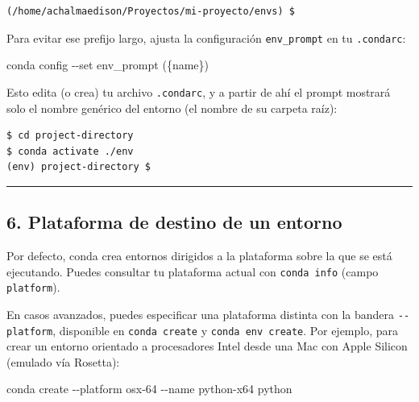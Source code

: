 \documentclass[
  doc,
  floatsintext,
  longtable,
  a4paper,
  nolmodern,
  notxfonts,
  notimes,
  12pt,
  colorlinks=true,linkcolor=blue,citecolor=blue,urlcolor=blue]{apa7}
\newenvironment{Shaded}{\begin{snugshade}}{\end{snugshade}}
\newcommand{\AttributeTok}[1]{\textcolor[rgb]{0.40,0.45,0.13}{#1}}
\newcommand{\ExtensionTok}[1]{\textcolor[rgb]{0.00,0.23,0.31}{#1}}
\newcommand{\NormalTok}[1]{\textcolor[rgb]{0.00,0.23,0.31}{#1}}
\newcommand{\StringTok}[1]{\textcolor[rgb]{0.13,0.47,0.30}{#1}}
\begin{document}
\begin{verbatim}
(/home/achalmaedison/Proyectos/mi-proyecto/envs) $
\end{verbatim}

Para evitar ese prefijo largo, ajusta la configuración
\texttt{env\_prompt} en tu \texttt{.condarc}:

\begin{Shaded}
\begin{Highlighting}[]
\ExtensionTok{conda}\NormalTok{ config }\AttributeTok{{-}{-}set}\NormalTok{ env\_prompt }\StringTok{\textquotesingle{}(\{name\})\textquotesingle{}}
\end{Highlighting}
\end{Shaded}

Esto edita (o crea) tu archivo \texttt{.condarc}, y a partir de ahí el
prompt mostrará solo el nombre genérico del entorno (el nombre de su
carpeta raíz):

\begin{verbatim}
$ cd project-directory
$ conda activate ./env
(env) project-directory $
\end{verbatim}

\begin{center}\rule{0.5\linewidth}{0.5pt}\end{center}

\subsection{6. Plataforma de destino de un
entorno}\label{plataforma-de-destino-de-un-entorno}

Por defecto, conda crea entornos dirigidos a la plataforma sobre la que
se está ejecutando. Puedes consultar tu plataforma actual con
\texttt{conda\ info} (campo \texttt{platform}).

En casos avanzados, puedes especificar una plataforma distinta con la
bandera \texttt{-\/-platform}, disponible en \texttt{conda\ create} y
\texttt{conda\ env\ create}. Por ejemplo, para crear un entorno
orientado a procesadores Intel desde una Mac con Apple Silicon (emulado
vía Rosetta):

\begin{Shaded}
\begin{Highlighting}[]
\ExtensionTok{conda}\NormalTok{ create }\AttributeTok{{-}{-}platform}\NormalTok{ osx{-}64 }\AttributeTok{{-}{-}name}\NormalTok{ python{-}x64 python}
\end{Highlighting}
\end{Shaded}
\end{document}
